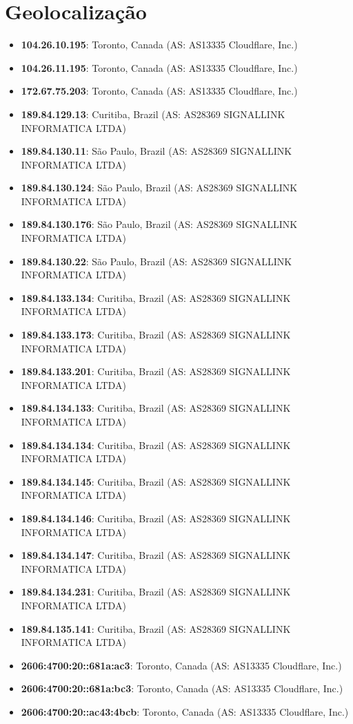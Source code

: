 
\section{Geolocalização}
\begin{itemize}
\item \textbf{104.26.10.195}: Toronto, Canada (AS: AS13335 Cloudflare, Inc.)\item \textbf{104.26.11.195}: Toronto, Canada (AS: AS13335 Cloudflare, Inc.)\item \textbf{172.67.75.203}: Toronto, Canada (AS: AS13335 Cloudflare, Inc.)\item \textbf{189.84.129.13}: Curitiba, Brazil (AS: AS28369 SIGNALLINK INFORMATICA LTDA)\item \textbf{189.84.130.11}: São Paulo, Brazil (AS: AS28369 SIGNALLINK INFORMATICA LTDA)\item \textbf{189.84.130.124}: São Paulo, Brazil (AS: AS28369 SIGNALLINK INFORMATICA LTDA)\item \textbf{189.84.130.176}: São Paulo, Brazil (AS: AS28369 SIGNALLINK INFORMATICA LTDA)\item \textbf{189.84.130.22}: São Paulo, Brazil (AS: AS28369 SIGNALLINK INFORMATICA LTDA)\item \textbf{189.84.133.134}: Curitiba, Brazil (AS: AS28369 SIGNALLINK INFORMATICA LTDA)\item \textbf{189.84.133.173}: Curitiba, Brazil (AS: AS28369 SIGNALLINK INFORMATICA LTDA)\item \textbf{189.84.133.201}: Curitiba, Brazil (AS: AS28369 SIGNALLINK INFORMATICA LTDA)\item \textbf{189.84.134.133}: Curitiba, Brazil (AS: AS28369 SIGNALLINK INFORMATICA LTDA)\item \textbf{189.84.134.134}: Curitiba, Brazil (AS: AS28369 SIGNALLINK INFORMATICA LTDA)\item \textbf{189.84.134.145}: Curitiba, Brazil (AS: AS28369 SIGNALLINK INFORMATICA LTDA)\item \textbf{189.84.134.146}: Curitiba, Brazil (AS: AS28369 SIGNALLINK INFORMATICA LTDA)\item \textbf{189.84.134.147}: Curitiba, Brazil (AS: AS28369 SIGNALLINK INFORMATICA LTDA)\item \textbf{189.84.134.231}: Curitiba, Brazil (AS: AS28369 SIGNALLINK INFORMATICA LTDA)\item \textbf{189.84.135.141}: Curitiba, Brazil (AS: AS28369 SIGNALLINK INFORMATICA LTDA)\item \textbf{2606:4700:20::681a:ac3}: Toronto, Canada (AS: AS13335 Cloudflare, Inc.)\item \textbf{2606:4700:20::681a:bc3}: Toronto, Canada (AS: AS13335 Cloudflare, Inc.)\item \textbf{2606:4700:20::ac43:4bcb}: Toronto, Canada (AS: AS13335 Cloudflare, Inc.)
\end{itemize}
